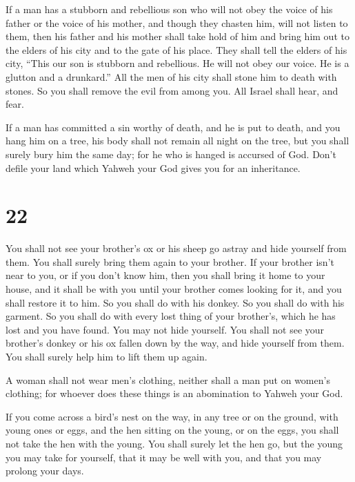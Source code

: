  If a man has a stubborn and rebellious son who will not
obey the voice of his father or the voice of his mother, and though they
chasten him, will not listen to them,  then his father and
his mother shall take hold of him and bring him out to the elders of his
city and to the gate of his place.  They shall tell the
elders of his city, ``This our son is stubborn and rebellious. He will
not obey our voice. He is a glutton and a drunkard.''  All
the men of his city shall stone him to death with stones. So you shall
remove the evil from among you. All Israel shall hear, and fear.

 If a man has committed a sin worthy of death, and he is
put to death, and you hang him on a tree,  his body shall
not remain all night on the tree, but you shall surely bury him the same
day; for he who is hanged is accursed of God. Don't defile your land
which Yahweh your God gives you for an inheritance.

\hypertarget{section-21}{%
\section{22}\label{section-21}}

 You shall not see your brother's ox or his sheep go astray
and hide yourself from them. You shall surely bring them again to your
brother.  If your brother isn't near to you, or if you don't
know him, then you shall bring it home to your house, and it shall be
with you until your brother comes looking for it, and you shall restore
it to him.  So you shall do with his donkey. So you shall do
with his garment. So you shall do with every lost thing of your
brother's, which he has lost and you have found. You may not hide
yourself.  You shall not see your brother's donkey or his ox
fallen down by the way, and hide yourself from them. You shall surely
help him to lift them up again.

 A woman shall not wear men's clothing, neither shall a man
put on women's clothing; for whoever does these things is an abomination
to Yahweh your God.

 If you come across a bird's nest on the way, in any tree or
on the ground, with young ones or eggs, and the hen sitting on the
young, or on the eggs, you shall not take the hen with the young.
 You shall surely let the hen go, but the young you may take
for yourself, that it may be well with you, and that you may prolong
your days.

